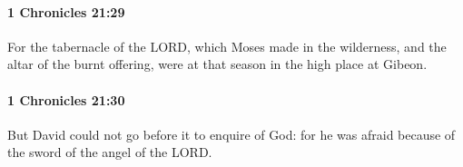 		\paragraph{1 Chronicles 21:29} %
			\label{1CHRONICLES-21-29}

			For the tabernacle of the LORD, which Moses made in the wilderness, and the altar of the burnt offering, were at that season in the high place at Gibeon.


		\paragraph{1 Chronicles 21:30} %
			\label{1CHRONICLES-21-30}

			But David could not go before it to enquire of God: for he was afraid because of the sword of the angel of the LORD.

